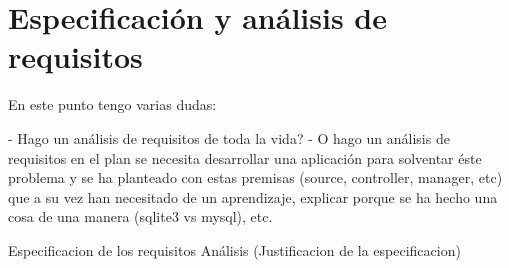 \chapter{Especificación y análisis de requisitos}
\label{chap:requisitos}

En este punto tengo varias dudas:

- Hago un análisis de requisitos de toda la vida?
- O hago un análisis de requisitos en el plan se necesita desarrollar una aplicación para solventar éste problema y se ha planteado con estas premisas (source, controller, manager, etc) que a su vez han necesitado de un aprendizaje, explicar porque se ha hecho una cosa de una manera (sqlite3 vs mysql), etc.

Especificacion de los requisitos
Análisis (Justificacion de la especificacion)
